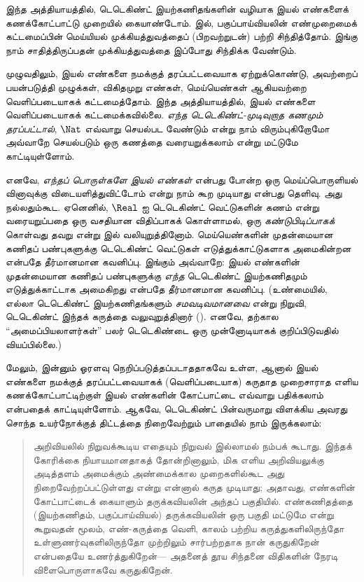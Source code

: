 \documentclass[../../../include/open-logic-section]{subfiles}
\begin{document}


இந்த அத்தியாயத்தில், டெடெகிண்ட் இயற்கணிதங்களின் வழியாக இயல் எண்களைக்
கணக்கோட்பாட்டு முறையில் கையாண்டோம்.  இல்,
பகுப்பாய்வியலின் எண்முறைமைக் கட்டமைப்பின் மெய்யியல் முக்கியத்துவத்தைப்
(பிறவற்றுடன்) பற்றி சிந்தித்தோம். இங்கு நாம் சாதித்திருப்பதன்
முக்கியத்துவத்தை இப்போது சிந்திக்க வேண்டும்.

 முழுவதிலும், இயல் எண்களை நமக்குத்
தரப்பட்டவையாக ஏற்றுக்கொண்டு, அவற்றைப் பயன்படுத்தி முழுக்கள்,
விகிதமுறு எண்கள், மெய்யெண்கள் ஆகியவற்றை வெளிப்படையாகக் கட்டமைத்தோம்.
இந்த அத்தியாயத்தில், இயல் எண்களை வெளிப்படையாகக் கட்டமைக்கவில்லை.
\emph{எந்த டெடெகிண்ட்-முடிவுறாத கணமும் தரப்பட்டால்}, $\Nat$ எவ்வாறு
செயல்பட வேண்டும் என்று நாம் விரும்புகிறோமோ அவ்வாறே செயல்படும் ஒரு
கணத்தை வரையறுக்கலாம் என்று மட்டுமே காட்டியுள்ளோம்.

எனவே, \emph{எந்தப் பொருள்களே இயல் எண்கள்} என்பது போன்ற ஒரு
மெய்ப்பொருளியல் வினாவுக்கு விடையளித்துவிட்டோம் என்று நாம் கூற முடியாது
என்பது தெளிவு. அது நல்லதும்கூட. ஏனெனில், $\Real$ ஐ டெடெகிண்ட்
வெட்டுகளின் கணம் என்று வரையறுப்பதை ஒரு வசதியான விதிப்பாகக் கொள்ளாமல்,
ஒரு \emph{கண்டுபிடிப்பாகக்} கொள்வது தவறு என்று
 இல் வலியுறுத்தினோம்.
மெய்யெண்களின் முதன்மையான கணிதப் பண்புகளுக்கு டெடெகிண்ட் வெட்டுகள்
எடுத்துக்காட்டுகளாக அமைகின்றன என்பதே தீர்மானமான கவனிப்பு.
இங்கும் அவ்வாறே: இயல் எண்களின் முதன்மையான கணிதப் பண்புகளுக்கு
\emph{எந்த} டெடெகிண்ட் இயற்கணிதமும் எடுத்துக்காட்டாக அமைகிறது என்பதே
தீர்மானமான கவனிப்பு. (உண்மையில், எல்லா டெடெகிண்ட் இயற்கணிதங்களும்
\emph{சமவடிவமானவை} என்று நிறுவி, டெடெகிண்ட் இந்தக் கருத்தை
வலுவுறுத்தினார் (\citeyear[Theorems
132--3]{Dedekind1888}).
எனவே, தற்கால ``அமைப்பியலாளர்கள்'' பலர் டெடெகிண்டை ஒரு முன்னோடியாகக்
குறிப்பிடுவதில் வியப்பில்லை.)

மேலும், இன்னும் ஓரளவு நெறிப்படுத்தப்படாததாகவே உள்ள, ஆனால் இயல்
எண்களை நமக்குத் தரப்பட்டவையாகக் (வெளிப்படையாக) கருதாத முறைசாராத
எளிய கணக்கோட்பாட்டிற்குள் இயல் எண்களின் கோட்பாட்டை எவ்வாறு பதிக்கலாம்
என்பதைக் காட்டியுள்ளோம். ஆகவே, டெடெகிண்ட் பின்வருமாறு விளக்கிய அவரது
சொந்த உயர்நோக்குத் திட்டத்தை நிறைவேற்றும் பாதையில் நாம் இருக்கலாம்:

\begin{quote}
	அறிவியலில் நிறுவக்கூடிய எதையும் நிறுவல் இல்லாமல் நம்பக் கூடாது.
	இந்தக் கோரிக்கை நியாயமானதாகத் தோன்றினாலும், மிக எளிய அறிவியலுக்கு
	அடித்தளம் அமைக்கும் அண்மைக்கால முறைகளில்கூட அது நிறைவேற்றப்பட்டுள்ளது
	என்று என்னால் கருத முடியாது; அதாவது, எண்களின் கோட்பாட்டைக் கையாளும்
	தருக்கவியலின் அந்தப் பகுதியில். எண்கணிதத்தை (இயற்கணிதம்,
	பகுப்பாய்வியல்) தருக்கவியலின் ஒரு பகுதி மட்டுமே என்று கூறுவதன் மூலம்,
	எண்-கருத்தை வெளி, காலம் பற்றிய கருத்துகளிலிருந்தோ உள்ளுணர்வுகளிலிருந்தோ
	முற்றிலும் சார்பற்றதாக நான் கருதுகிறேன் என்பதையே உணர்த்துகிறேன்---
	அதனைத் தூய சிந்தனை விதிகளின் நேரடி விளைபொருளாகவே கருதுகிறேன்.
	\citep[preface]{Dedekind1888}
\end{quote}
\end{document}
